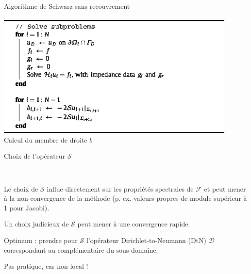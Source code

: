 \documentclass[
mode=present,    %
paper=a4paper,   %
orient=landscape,
display=slides,   %
size=10pt,
style=romain   %
]{powerdot}
\begin{document}
\begin{slide}[toc=]{Algorithme de Schwarz sans recouvrement}

\bigskip
\begin{center}
 \includegraphics[width=0.9\textwidth]{algo2.eps}\\[1em]
 Calcul du membre de droite $b$
\end{center}

\end{slide}

\begin{slide}[toc=Opérateurs de transmission]{Choix de l'opérateur $\mathcal{S}$}

~

\bigskip\bigskip\bigskip

Le choix de $\mathcal{S}$ influe directement sur les propriétés spectrales
de $\mathcal{F}$ et peut mener à la non-convergence de la méthode (p. ex. valeurs propres de
module supérieur à 1 pour Jacobi). 

\bigskip

Un choix judicieux de $\mathcal{S}$ peut mener à une convergence rapide.

\bigskip

Optimum : prendre pour $\mathcal{S}$ l'opérateur
Dirichlet-to-Neumann (DtN) $\mathcal{D}$ correspondant au complémentaire du
sous-domaine.

\bigskip

Pas pratique, car non-local !

\end{slide}
\end{document}
